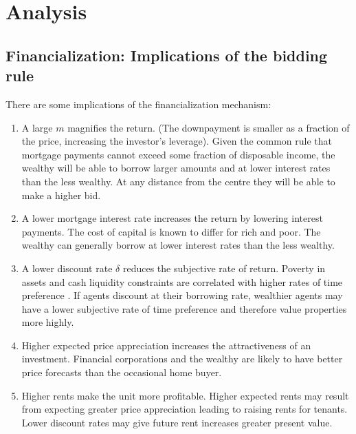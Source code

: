 \chapter{Analysis} \label{chapter-analysis}




\section{Financialization: Implications of the bidding rule}

There are some implications of the financialization mechanism:
\begin{enumerate}
\item A large $m$ magnifies the return. (The downpayment is smaller as a fraction of the price, increasing the investor's leverage). 
Given the  common rule that mortgage payments cannot exceed some fraction of disposable income, the wealthy will be able to borrow larger amounts and at lower interest rates than the less wealthy. At any distance from the centre they will be able to make a higher bid.

\item A lower mortgage interest rate increases the return by lowering interest payments. The cost of capital is known to differ for rich and poor.  The wealthy can generally borrow  at lower interest rates than the less wealthy. 

\item A lower discount rate $\delta$ reduces the subjective rate of return.  Poverty in assets and cash liquidity constraints are correlated with higher rates of time preference  \cite{carvalhoPovertyTimePreference2010}\cite{holdenPovertyMarketImperfections1998}. If agents discount at their borrowing rate, wealthier agents may have a lower subjective rate of time preference and therefore value properties more highly. 

\item Higher expected price appreciation increases the attractiveness of an investment. Financial corporations and the wealthy are likely to have better price forecasts than  the occasional home buyer.

\item Higher rents make the unit more profitable. Higher expected  rents may result from expecting greater price appreciation  leading to raising rents for tenants. Lower discount rates may give future rent increases greater present value.


\end{enumerate}
